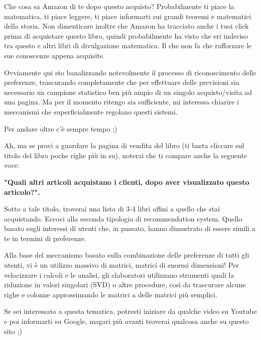 Che cosa sa Amazon di te dopo questo acquisto? Probabilmente ti piace la matematica, ti piace leggere, ti piace informarti sui grandi teoremi e matematici della storia. Non dimenticare inoltre che Amazon ha tracciato anche i tuoi click prima di acquistare questo libro, quindi probabilmente ha visto che eri indeciso tra questo e altri libri di divulgazione matematica. Il che non fa che rafforzare le sue conoscenze appena acquisite.

Ovviamente qui sto banalizzando notevolmente il processo di riconoscimento delle preferenze, trascurando completamente che per effettuare delle previsioni sia necessario un campione statistico ben più ampio di un singolo acquisto/visita ad una pagina. Ma per il momento ritengo sia sufficiente, mi interessa chiarire i meccanismi che superficialmente regolano questi sistemi.

Per andare oltre c'è sempre tempo ;)

Ah, ma se provi a guardare la pagina di vendita del libro (ti basta cliccare sul titolo del libro poche righe più in su), noterai che ti compare anche la seguente voce:

\textbf{"Quali altri articoli acquistano i clienti, dopo aver visualizzato questo articolo?".}

Sotto a tale titolo, troverai una lista di 3-4 libri affini a quello che stai acquistando. Eccoci alla seconda tipologia di recommendation system. Quello basato sugli interessi di utenti che, in passato, hanno dimostrato di essere simili a te in termini di preferenze.

Alla base del meccanismo basato sulla combinazione delle preferenze di tutti gli utenti, vi è un utilizzo massivo di matrici, matrici di enormi dimensioni! Per velocizzare i calcoli e le analisi, gli elaboratori utilizzano strumenti quali la riduzione in valori singolari (SVD) o altre procedure, così da trascurare alcune righe e colonne approssimando le matrici a delle matrici più semplici.

Se sei interessato a questa tematica, potresti iniziare da qualche video su Youtube e poi informarti su Google, magari più avanti troverai qualcosa anche su questo sito ;)




